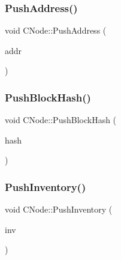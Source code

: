 \subsubsection{\texorpdfstring{Push\+Address()}{PushAddress()}}
{\footnotesize\ttfamily void C\+Node\+::\+Push\+Address (\begin{DoxyParamCaption}\item[{const \mbox{\hyperlink{class_c_address}{C\+Address}} \&}]{addr }\end{DoxyParamCaption})\hspace{0.3cm}{\ttfamily [inline]}}

\mbox{\label{class_c_node_aa3315bf026b3c2e27f222b5540c6d472}} 
\subsubsection{\texorpdfstring{Push\+Block\+Hash()}{PushBlockHash()}}
{\footnotesize\ttfamily void C\+Node\+::\+Push\+Block\+Hash (\begin{DoxyParamCaption}\item[{const \mbox{\hyperlink{classuint256}{uint256}} \&}]{hash }\end{DoxyParamCaption})\hspace{0.3cm}{\ttfamily [inline]}}

\mbox{\label{class_c_node_a7cef2333aa8776127a7e7fcab659eb6a}} 
\subsubsection{\texorpdfstring{Push\+Inventory()}{PushInventory()}}
{\footnotesize\ttfamily void C\+Node\+::\+Push\+Inventory (\begin{DoxyParamCaption}\item[{const \mbox{\hyperlink{class_c_inv}{C\+Inv}} \&}]{inv }\end{DoxyParamCaption})\hspace{0.3cm}{\ttfamily [inline]}}

\mbox{\label{class_c_node_a204fda3d33404cb37698c085b1583ab2}} 
